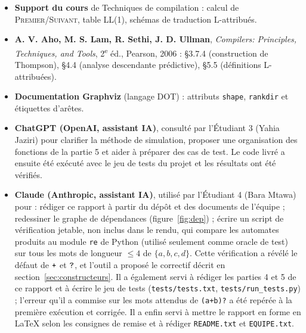 \documentclass[12pt,a4paper]{article}
\newcommand{\code}[1]{{\fontsize{10}{12}\selectfont\texttt{#1}}}
\newcommand{\Prem}{\textsc{Premier}}
\newcommand{\Suiv}{\textsc{Suivant}}
\newcommand{\tok}[1]{\ensuremath{\text{\fontsize{10}{12}\selectfont\ttfamily #1}}}
\begin{document}
\begin{itemize}
\item \textbf{Support du cours} de Techniques de compilation : calcul de \Prem/\Suiv, table
  LL(1), schémas de traduction L-attribués.
\item \textbf{A. V. Aho, M. S. Lam, R. Sethi, J. D. Ullman}, \emph{Compilers: Principles,
  Techniques, and Tools}, 2\textsuperscript{e} éd., Pearson, 2006 : §3.7.4 (construction de
  Thompson), §4.4 (analyse descendante prédictive), §5.5 (définitions L-attribuées).
\item \textbf{Documentation Graphviz} (langage DOT) : attributs \code{shape}, \code{rankdir} et
  étiquettes d'arêtes.
\item \textbf{ChatGPT (OpenAI, assistant IA)}, consulté par l'Étudiant 3 (Yahia Jaziri) pour
  clarifier la méthode de simulation, proposer une organisation des fonctions de la partie 5 et
  aider à préparer des cas de test. Le code livré a ensuite été exécuté avec le jeu de tests du
  projet et les résultats ont été vérifiés.
\item \textbf{Claude (Anthropic, assistant IA)}, utilisé par l'Étudiant 4 (Bara Mtawa) pour : rédiger ce
  rapport à partir du dépôt et des documents de l'équipe ; redessiner le graphe de dépendances
  (figure~\ref{fig:dep}) ; écrire un script de vérification jetable, non inclus dans le rendu,
  qui compare les automates produits au module \code{re} de Python (utilisé seulement comme
  oracle de test) sur tous les mots de longueur $\le 4$ de $\{a, b, c, d\}$. Cette vérification
  a révélé le défaut de \tok{+} et \tok{?}, et l'outil a proposé le correctif décrit en
  section~\ref{sec:constructeurs}. Il a également servi à rédiger les parties 4 et 5 de ce
  rapport et à écrire le jeu de tests (\code{tests/tests.txt}, \code{tests/run\_tests.py}) ;
  l'erreur qu'il a commise sur les mots attendus de \code{(a+b)?} a été repérée à la première
  exécution et corrigée. Il a enfin servi à mettre le rapport en forme en \LaTeX{} selon les
  consignes de remise et à rédiger \code{README.txt} et \code{EQUIPE.txt}.
\end{itemize}
\end{document}
